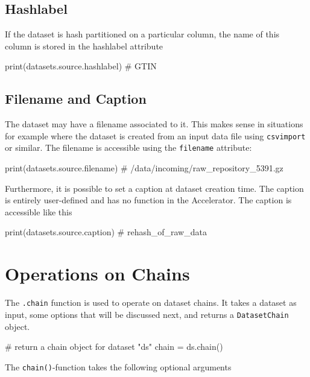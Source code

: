 \subsection{Hashlabel}
If the dataset is hash partitioned on a particular column, the name of
this column is stored in the hashlabel attribute
\begin{python}
print(datasets.source.hashlabel)
# GTIN
\end{python}



\subsection{Filename and Caption}
The dataset may have a filename associated to it.  This makes sense in
situations for example where the dataset is created from an input data
file using \texttt{csvimport} or similar.  The filename is accessible
using the \texttt{filename} attribute:
\begin{python}
print(datasets.source.filename)
# /data/incoming/raw_repository_5391.gz
\end{python}
Furthermore, it is possible to set a caption at dataset creation time.
The caption is entirely user-defined and has no function in the
Accelerator.  The caption is accessible like this
\begin{python}
print(datasets.source.caption)
# rehash_of_raw_data
\end{python}



\section{Operations on Chains}
The \texttt{.chain} function is used to operate on dataset chains.  It
takes a dataset as input, some options that will be discussed next,
and returns a \texttt{DatasetChain} object.
\begin{python}
# return a chain object for dataset "ds"
chain = ds.chain()
\end{python}
The \texttt{chain()}-function takes the following optional arguments

